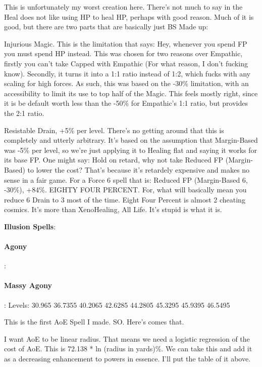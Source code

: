 \begin{multicols*}{2}
	This is unfortunately my worst creation here. There's not much to say in the Heal does not like using HP to heal HP, perhaps with good reason. Much of it is good, but there are two parts that are basically just BS Made up:
	
	Injurious Magic. This is the limitation that says: Hey, whenever you spend FP you must spend HP instead. This was chosen for two reasons over Empathic, firstly you can't take Capped with Empathic (For what reason, I don't fucking know). Secondly, it turns it into a 1:1 ratio instead of 1:2, which fucks with any scaling for high forces. As such, this was based on the -30\% limitation, with an accessibility to limit its use to top half of the Magic. This feels mostly right, since it is be default worth less than the -50\% for Empathic's 1:1 ratio, but provides the 2:1 ratio.
	
	Resistable Drain, +5\% per level. There's no getting around that this is completely and utterly arbitrary. It's based on the assumption that Margin-Based was -5\% per level, so we're just applying it to Healing flat and saying it works for its base FP. One might say: Hold on retard, why not take Reduced FP (Margin-Based) to lower the cost? That's because it's retardely expensive and makes no sense in a fair game. For a Force 6 spell that is: Reduced FP (Margin-Based 6, -30\%), +84\%. EIGHTY FOUR PERCENT. For, what will basically mean you reduce 6 Drain to 3 most of the time. Eight Four Percent is almost 2 cheating cosmics. It's more than XenoHealing, All Life. It's stupid is what it is.
	
	\textbf{Illusion Spells}:
	
	\paragraph{Agony}: 
	
	\paragraph{Massy Agony}: Levels: 30.965 36.7355 40.2065 42.6285 44.2805 45.3295 45.9395 46.5495
	
	This is the first AoE Spell I made. SO. Here's comes that.
	
	I want AoE to be linear radius. That means we need a logistic regression of the cost of AoE. This is 72.138 * ln (radius in yards)\%. We can take this and add it as a decreasing enhancement to powers in essence. I'll put the table of it above.
	

\end{multicols*}
